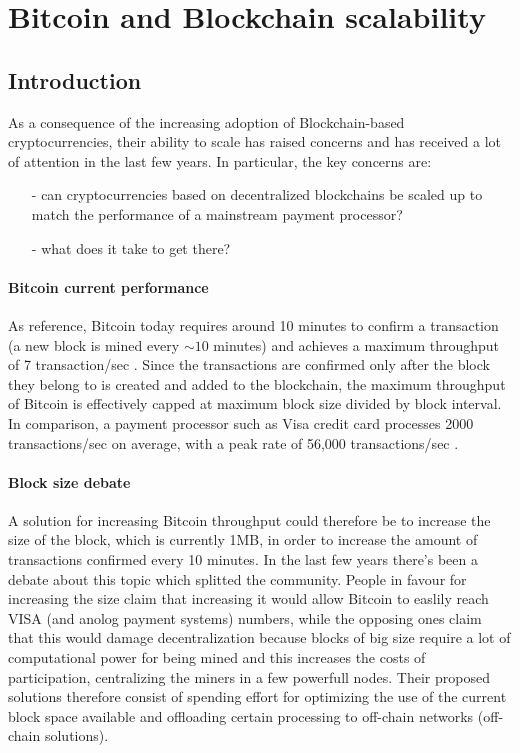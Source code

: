 \section{Bitcoin and Blockchain scalability}
\subsection{Introduction}
As a consequence of the increasing adoption of Blockchain-based cryptocurrencies,
their ability to scale has raised concerns and has received a lot of attention
in the last few years. In particular, the key concerns are:
\begin{itemize}
  \item[-] can cryptocurrencies based on decentralized blockchains be scaled up
  to match the performance of a mainstream payment processor?
  \item[-] what does it take to get there?
\end{itemize}

\paragraph{Bitcoin current performance} As reference, Bitcoin today requires
around 10 minutes to confirm a transaction (a new block is mined every $\sim10$
minutes) and achieves a maximum throughput of 7 transaction/sec
\cite{wikipedia_scalability_2018}. Since the transactions are confirmed only
after the block they belong to is created and added to the blockchain, the
maximum throughput of Bitcoin is effectively capped at maximum block size
divided by block interval. In comparison, a payment processor such as Visa
credit card processes 2000 transactions/sec on average, with a peak rate of
56,000 transactions/sec \cite{wikipedia_scalability_2018}.

\paragraph{Block size debate} A solution for increasing Bitcoin throughput could
therefore be to increase the size of the block, which is currently 1MB, in order
to increase the amount of transactions confirmed every 10 minutes. In the last
few years there's been a debate about this topic which splitted the community.
People in favour for increasing the size claim that increasing it would allow
Bitcoin to easlily reach VISA (and anolog payment systems) numbers, while the
opposing ones claim that this would damage decentralization because blocks of
big size require a lot of computational power for being mined and this increases
the costs of participation, centralizing the miners in a few powerfull nodes.
Their proposed solutions therefore consist of spending effort for optimizing
the use of the current block space available and offloading certain processing
to off-chain networks (off-chain solutions).
